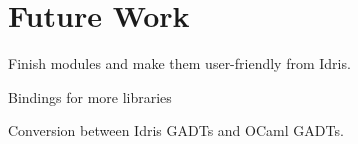 \section{Future Work}

Finish modules and make them user-friendly from Idris.

Bindings for more libraries

Conversion between Idris GADTs and OCaml GADTs.



